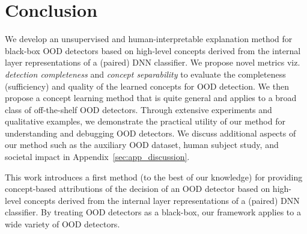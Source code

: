 


\section{Conclusion}
We develop an unsupervised and human-interpretable explanation method for black-box OOD detectors based on high-level concepts derived from the internal layer representations of a (paired) DNN classifier.
We propose novel metrics viz. {\em detection completeness} and {\em concept separability} to evaluate the completeness (sufficiency) and quality of the learned concepts for OOD detection.
We then propose a concept learning method that is quite general and applies to a broad class of off-the-shelf OOD detectors.
Through extensive experiments and qualitative examples, we demonstrate the practical utility of our method for understanding and debugging OOD detectors.
We discuss additional aspects of our method such as the auxiliary OOD dataset, human subject study, and societal impact in Appendix~\ref{sec:app_discussion}.

\iffalse

This work introduces a first method (to the best of our knowledge) for providing concept-based attributions of the decision of an OOD detector based on high-level concepts derived from the internal layer representations of a (paired) DNN classifier.
By treating OOD detectors as a black-box, our framework applies to a wide variety of OOD detectors.

